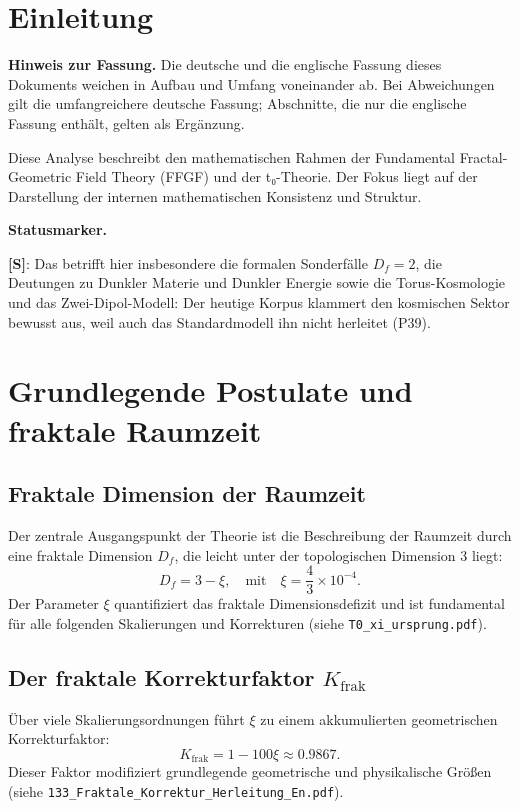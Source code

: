 \section{Einleitung}

	\medskip\noindent\textbf{Hinweis zur Fassung.} Die deutsche und die englische Fassung dieses Dokuments weichen in Aufbau und Umfang voneinander ab. Bei Abweichungen gilt die umfangreichere deutsche Fassung; Abschnitte, die nur die englische Fassung enthält, gelten als Ergänzung.

	Diese Analyse beschreibt den mathematischen Rahmen der Fundamental Fractal-Geometric Field Theory (FFGF) und der t₀-Theorie. Der Fokus liegt auf der Darstellung der internen mathematischen Konsistenz und Struktur.

	\medskip\noindent\textbf{Statusmarker.}
	

	\noindent \textbf{[S]}: Das betrifft hier insbesondere die formalen Sonderfälle $D_f = 2$, die Deutungen zu Dunkler Materie und Dunkler Energie sowie die Torus-Kosmologie und das Zwei-Dipol-Modell: Der heutige Korpus klammert den kosmischen Sektor bewusst aus, weil auch das Standardmodell ihn nicht herleitet (P39).
	
	\section{Grundlegende Postulate und fraktale Raumzeit}
	\subsection{Fraktale Dimension der Raumzeit}
	Der zentrale Ausgangspunkt der Theorie ist die Beschreibung der Raumzeit durch eine fraktale Dimension \(D_f\), die leicht unter der topologischen Dimension 3 liegt:
	\begin{equation}
		D_f = 3 - \xi, \quad \text{mit} \quad \xi = \frac{4}{3} \times 10^{-4}.
		\label{eq:fractal_dimension}
	\end{equation}
	Der Parameter \(\xi\) quantifiziert das fraktale Dimensionsdefizit und ist fundamental für alle folgenden Skalierungen und Korrekturen 
	(siehe \texttt{T0\_xi\_ursprung.pdf}).
	
	\subsection{Der fraktale Korrekturfaktor \(K_{\text{frak}}\)}
	Über viele Skalierungsordnungen führt \(\xi\) zu einem akkumulierten geometrischen Korrekturfaktor:
	\begin{equation}
		K_{\text{frak}} = 1 - 100\xi \approx 0.9867.
		\label{eq:K_frak}
	\end{equation}
	Dieser Faktor modifiziert grundlegende geometrische und physikalische Größen 
	(siehe \texttt{133\_Fraktale\_Korrektur\_Herleitung\_En.pdf}).
	
